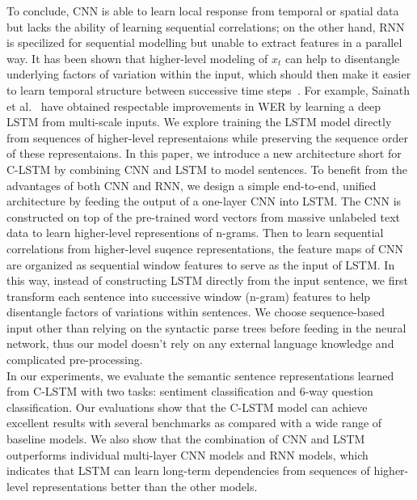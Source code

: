 \documentclass[11pt,letterpaper]{article}
\begin{document}
\indent To conclude, CNN is able to learn local response from temporal or spatial data but lacks the ability of learning sequential correlations; on the other hand, RNN is specilized for sequential modelling but unable to extract features in a parallel way.
It has been shown that higher-level modeling of $x_t$ can help to disentangle underlying factors of variation within the input, which should then make it easier to learn temporal structure between successive time steps~\cite{evidence}. For example, Sainath et al.~\cite{saina} have obtained respectable improvements in WER by learning a deep LSTM from multi-scale  inputs.
We explore training the LSTM model directly from sequences of higher-level representaions while preserving the sequence order of these representaions.
In this paper, we introduce a new architecture short for C-LSTM by combining CNN and LSTM to model sentences.
To benefit from the advantages of both CNN and RNN, we design a simple end-to-end, unified architecture by feeding the output of a one-layer CNN into LSTM.
The CNN is constructed on top of the pre-trained word vectors from massive unlabeled text data to learn higher-level representions of n-grams.
Then to learn sequential correlations from higher-level suqence representations, the feature maps of CNN are organized as sequential window features to serve as the input of LSTM.
In this way, instead of constructing LSTM directly from the input sentence, we first transform each sentence into successive window (n-gram) features to help disentangle factors of variations within sentences.
We choose sequence-based input other than relying on the syntactic parse trees before feeding in the neural network, thus our model doesn't rely on any external language knowledge and complicated pre-processing.\\
\indent In our experiments, we evaluate the semantic sentence
representations learned from C-LSTM with two tasks: sentiment
classification and 6-way question classification. Our evaluations show
that the C-LSTM model can achieve excellent results with several benchmarks
as compared with a wide range of baseline models. We also show that the
combination of CNN and LSTM outperforms individual multi-layer CNN
models and RNN models, which indicates that LSTM can learn
long-term dependencies from sequences of higher-level representations
better than the other models.
\end{document}
